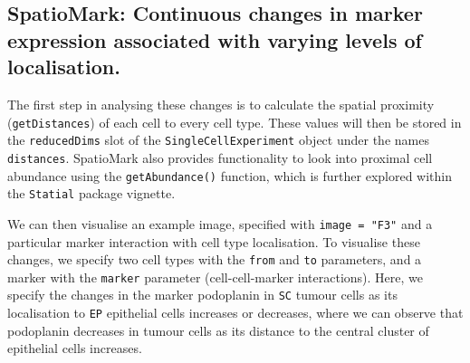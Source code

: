 \documentclass[
  letterpaper,
  DIV=11,
  numbers=noendperiod]{scrreprt}
\newenvironment{Shaded}{\begin{snugshade}}{\end{snugshade}}
\newcommand{\AttributeTok}[1]{\textcolor[rgb]{0.40,0.45,0.13}{#1}}
\newcommand{\DecValTok}[1]{\textcolor[rgb]{0.68,0.00,0.00}{#1}}
\newcommand{\FunctionTok}[1]{\textcolor[rgb]{0.28,0.35,0.67}{#1}}
\newcommand{\NormalTok}[1]{\textcolor[rgb]{0.00,0.23,0.31}{#1}}
\newcommand{\OtherTok}[1]{\textcolor[rgb]{0.00,0.23,0.31}{#1}}
\newcommand{\SpecialCharTok}[1]{\textcolor[rgb]{0.37,0.37,0.37}{#1}}
\newcommand{\StringTok}[1]{\textcolor[rgb]{0.13,0.47,0.30}{#1}}
\begin{document}
\subsection{SpatioMark: Continuous changes in marker expression
associated with varying levels of
localisation.}\label{spatiomark-continuous-changes-in-marker-expression-associated-with-varying-levels-of-localisation.}

The first step in analysing these changes is to calculate the spatial
proximity (\texttt{getDistances}) of each cell to every cell type. These
values will then be stored in the \texttt{reducedDims} slot of the
\texttt{SingleCellExperiment} object under the names \texttt{distances}.
SpatioMark also provides functionality to look into proximal cell
abundance using the \texttt{getAbundance()} function, which is further
explored within the \texttt{Statial} package vignette.

\begin{Shaded}
\end{Shaded}

We can then visualise an example image, specified with
\texttt{image\ =\ "F3"} and a particular marker interaction with cell
type localisation. To visualise these changes, we specify two cell types
with the \texttt{from} and \texttt{to} parameters, and a marker with the
\texttt{marker} parameter (cell-cell-marker interactions). Here, we
specify the changes in the marker podoplanin in \texttt{SC} tumour cells
as its localisation to \texttt{EP} epithelial cells increases or
decreases, where we can observe that podoplanin decreases in tumour
cells as its distance to the central cluster of epithelial cells
increases.
\end{document}
